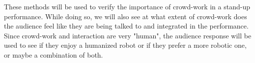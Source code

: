 \documentclass[onecolumn, draftclsnofoot,10pt, compsoc]{IEEEtran}
\begin{document}
These methods will be used to verify the importance of crowd-work in a stand-up performance. While doing so, we will also see at what extent of crowd-work does the audience feel like they are being talked to and integrated in the performance. Since crowd-work and interaction are very "human", the audience response will be used to see if they enjoy a humanized robot or if they prefer a more robotic one, or maybe a combination of both.

\pagebreak




\end{document}
